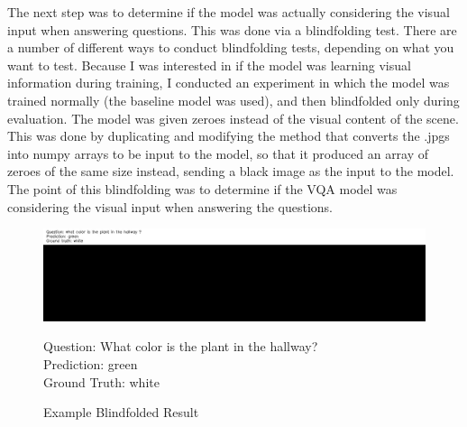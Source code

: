 The next step was to determine if the model was actually considering the visual input when answering questions. This was done via a blindfolding test. There are a number of different ways to conduct blindfolding tests, depending on what you want to test. Because I was interested in if the model was learning visual information during training, I conducted an experiment in which the model was trained normally (the baseline model was used), and then blindfolded only during evaluation. The model was given zeroes instead of the visual content of the scene. This was done by duplicating and modifying the method that converts the .jpgs into numpy arrays to be input to the model, so that it produced an array of zeroes of the same size instead, sending a black image as the input to the model. The point of this blindfolding was to determine if the VQA model was considering the visual input when answering the questions. 
\begin{figure}[h]
	\centering
        \includegraphics[width=\textwidth]{./figure/results/baseline_and_blindfolding/blindfolded/ckpt_23_1250_image.jpg}
	\captionsetup{justification=raggedright, textfont=footnotesize}
	\caption*{Question: What color is the plant in the hallway? \\
	Prediction: green \\
	Ground Truth: white}
    \captionsetup{labelfont=bf, textfont=normal,
			justification=centering,
			singlelinecheck=false}
	\caption{Example Blindfolded Result}
	\label{fig:example_blindfolded_result}
\end{figure}

